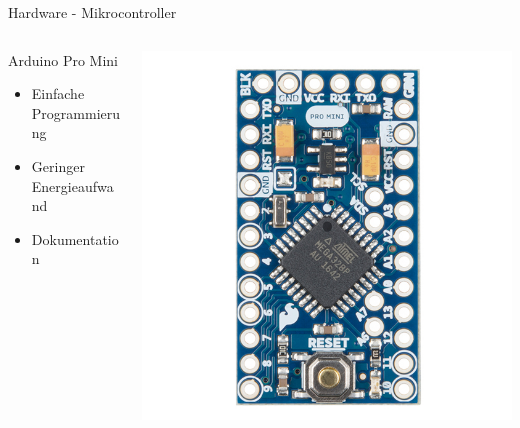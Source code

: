 \documentclass{beamer}
\begin{document}
\begin{frame}{Hardware - Mikrocontroller}

\begin{columns}[T] %
	\begin{column}{.48\textwidth}
		\begin{block}{Arduino Pro Mini}
			\begin{itemize}
				\item Einfache Programmierung
				\item Geringer Energieaufwand
				\item Dokumentation
			\end{itemize}
		\end{block}
	\end{column}%
	\hfill%
	\begin{column}{.48\textwidth}
		\includegraphics{arduino}
	\end{column}%
\end{columns}

\end{frame}
\end{document}
